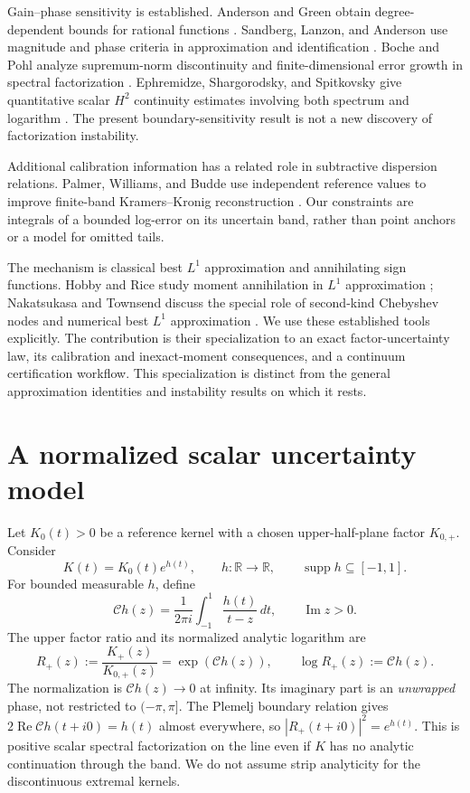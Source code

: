 \documentclass[11pt]{article}
\theoremstyle{remark}\newtheorem{remark}[theorem]{Remark}
\newcommand{\C}{\mathcal C}
\newcommand{\Real}{\operatorname{Re}}
\newcommand{\Imag}{\operatorname{Im}}
\begin{document}
Gain--phase sensitivity is established. Anderson and Green obtain
degree-dependent bounds for rational functions \cite{anderson}.
Sandberg, Lanzon, and Anderson use magnitude and phase criteria in approximation
and identification \cite{sandberg}. Boche and Pohl analyze supremum-norm
discontinuity and finite-dimensional error growth in spectral factorization
\cite{boche}. Ephremidze, Shargorodsky, and Spitkovsky give quantitative
scalar $H^2$ continuity estimates involving both spectrum and logarithm
\cite{ephremidze}. The present boundary-sensitivity result is not a new discovery
of factorization instability.

Additional calibration information has a related role in subtractive dispersion
relations. Palmer, Williams, and Budde use independent reference values to improve
finite-band Kramers--Kronig reconstruction \cite{palmer}. Our constraints are
integrals of a bounded log-error on its uncertain band, rather than point anchors
or a model for omitted tails.

The mechanism is classical best $L^1$ approximation and annihilating sign
functions. Hobby and Rice study moment annihilation in $L^1$ approximation
\cite{hobby}; Nakatsukasa and Townsend discuss the special role of second-kind
Chebyshev nodes and numerical best $L^1$ approximation \cite{nakatsukasa}.
We use these established tools explicitly. The contribution is their
specialization to an exact factor-uncertainty law, its calibration and
inexact-moment consequences, and a continuum certification workflow.
This specialization is distinct from the general approximation identities and
instability results on which it rests.

\section{A normalized scalar uncertainty model}
Let $K_0(t)>0$ be a reference kernel with a chosen upper-half-plane factor
$K_{0,+}$. Consider
\begin{equation}\label{eq:model}
 K(t)=K_0(t)e^{h(t)},\qquad h:\mathbb R\to\mathbb R,\qquad
 \operatorname{supp}h\subseteq[-1,1].
\end{equation}
For bounded measurable $h$, define
\begin{equation}\label{eq:cauchy}
 \C h(z)=\frac{1}{2\pi i}\int_{-1}^{1}\frac{h(t)}{t-z}\,dt,
 \qquad \Imag z>0.
\end{equation}
The upper factor ratio and its normalized analytic logarithm are
\begin{equation}\label{eq:ratio}
 R_+(z):=\frac{K_+(z)}{K_{0,+}(z)}=\exp(\C h(z)),
 \qquad \log R_+(z):=\C h(z).
\end{equation}
The normalization is $\C h(z)\to0$ at infinity. Its imaginary part is an
\emph{unwrapped} phase, not restricted to $(-\pi,\pi]$.
The Plemelj boundary relation gives $2\Real \C h(t+i0)=h(t)$ almost everywhere,
so $|R_+(t+i0)|^2=e^{h(t)}$.
This is positive scalar spectral factorization on the line even if $K$ has no
analytic continuation through the band. We do not assume strip analyticity
for the discontinuous extremal kernels.
\end{document}
